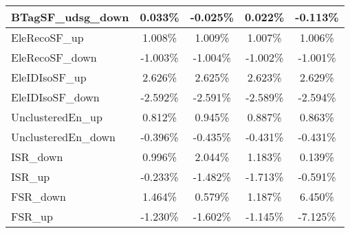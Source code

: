 \begin{table}[]
{\begin{tabular}{|l|c|c|c|c|}
BTagSF\_udsg\_down                          & 0.033\%                           & -0.025\%                           & 0.022\%                          & -0.113\%                           \\ \hline     
EleRecoSF\_up                            & 1.008\%                             & 1.009\%                             & 1.007\%                            & 1.006\%                             \\ \hline    
EleRecoSF\_down                          & -1.003\%                           & -1.004\%                           & -1.002\%                          & -1.001\%                           \\ \hline    
EleIDIsoSF\_up                              & 2.626\%                               & 2.625\%                               & 2.623\%                              & 2.629\%                               \\ \hline    
EleIDIsoSF\_down                            & -2.592\%                             & -2.591\%                             & -2.589\%                            & -2.594\%                             \\ \hline        
UnclusteredEn\_up                         & 0.812\%                          & 0.945\%                          & 0.887\%                         & 0.863\%                          \\ \hline    
UnclusteredEn\_down                      & -0.396\%                         & -0.435\%                        & -0.431\%                       & -0.431\%                        \\ \hline   \hline 
ISR\_down                                & 0.996\%                                   & 2.044\%                                  & 1.183\%                                 & 0.139\%                                  \\ \hline
ISR\_up                                  & -0.233\%                                     & -1.482\%                                    & -1.713\%                                   & -0.591\%                                    \\ \hline
FSR\_down                                & 1.464\%                                   & 0.579\%                                  & 1.187\%                                 & 6.450\%                                  \\ \hline
FSR\_up                                  & -1.230\%                                     & -1.602\%                                    & -1.145\%                                   & -7.125\%                                    \\ \hline 

\end{tabular}}
\end{table}
